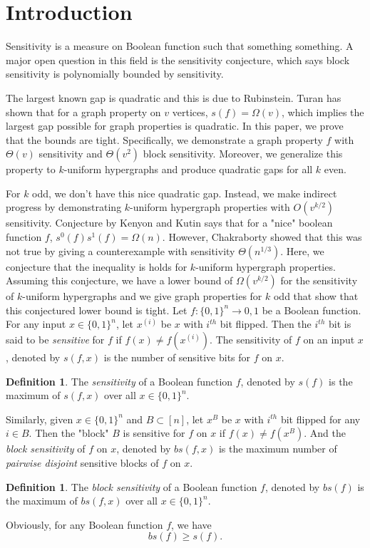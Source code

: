 \documentclass[psamsfonts]{amsart}
\theoremstyle{definition}
\newtheorem{defn}[theorem]{Definition}
\theoremstyle{remark}
\numberwithin{equation}{section}
\begin{document}
	\section{Introduction}
	Sensitivity is a measure on Boolean function such that something something. A major open question in this field is the sensitivity conjecture, which says block sensitivity is polynomially bounded by sensitivity. 
	\begin{•}	
	The largest known gap is quadratic and this is due to Rubinstein. Turan has shown that for a graph property on $v$ vertices, $s(f) = \Omega(v)$, which implies the largest gap possible for graph properties is quadratic. In this paper, we prove that the bounds are tight. Specifically, we demonstrate a graph property $f$ with $\Theta(v)$ sensitivity and $\Theta(v^2)$ block sensitivity. Moreover, we generalize this property to $k$-uniform hypergraphs and produce quadratic gaps for all $k$ even.

	For $k$ odd, we don't have this nice quadratic gap. Instead, we make indirect progress by demonstrating $k$-uniform hypergraph properties with $O(v^{k/2})$ sensitivity. Conjecture by Kenyon and Kutin says that for a "nice" boolean function $f$, $s^0(f)s^1(f) = \Omega(n)$. However, Chakraborty showed that this was not true by giving a counterexample with sensitivity $\Theta(n^{1/3})$. Here, we conjecture that the inequality is holds for $k$-uniform hypergraph properties. Assuming this conjecture, we have a lower bound of $\Omega(v^{k/2})$ for the sensitivity of $k$-uniform hypergraphs and we give graph properties for $k$ odd that show that this conjectured lower bound is tight.
	Let $f: \{0,1\}^n \to {0,1}$ be a Boolean function. For any input $x \in \{0,1 \}^n$, let $x^{(i)}$ be $x$ with $i^{th}$ bit flipped. Then the $i ^ {th}$ bit is said to be \textit{sensitive} for $f$ if $f(x) \neq f(x^{(i)})$. The sensitivity of $f$ on an input $x$, denoted by $s(f,x)$ is the number of sensitive bits for $f$ on $x$.
		\begin{defn}
			The \textit{sensitivity} of a Boolean function $f$, denoted by $s(f)$ is the maximum of $s(f,x)$ over all $x \in \{0,1\}^n$.
		\end{defn}
		Similarly, given $x \in \{0,1\}^n$ and $B \subset [n]$, let $x^{B}$ be $x$ with $i^{th}$ bit flipped for any $i \in B$. Then the "block" $B$ is sensitive for $f$ on $x$ if $f(x) \neq f(x^B)$. And the \textit{block sensitivity} of $f$ on $x$, denoted by $bs(f,x)$ is the maximum number of \textit{pairwise disjoint} sensitive blocks of $f$ on $x$.
		\begin{defn}
			The \textit{block sensitivity} of a Boolean function $f$, denoted by $bs(f)$ is the maximum of $bs(f,x)$ over all $x \in \{0,1\}^n$.
		\end{defn}
		Obviously, for any Boolean function $f$, we have 
		\begin{equation}
			bs(f) \geq s(f). \nonumber
		\end{equation}
		

\end{•}
\end{document}
